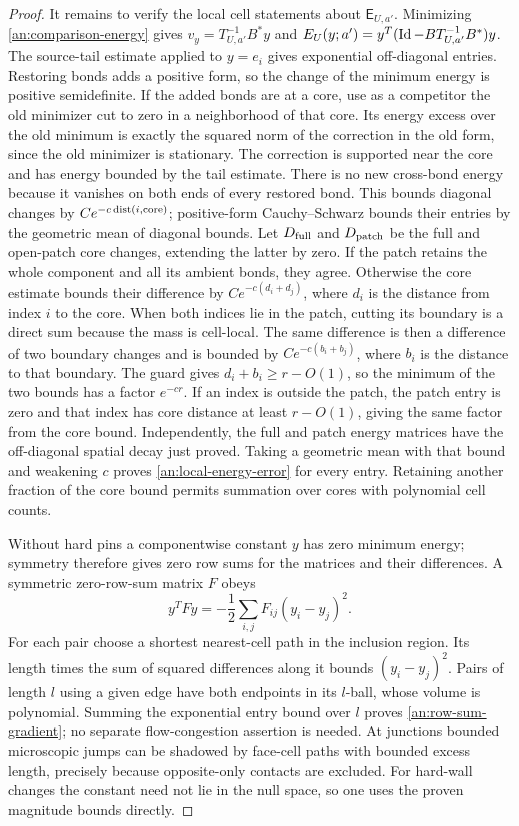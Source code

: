 \begin{proof}
It remains to verify the local cell statements about
$\mathsf E_{U,a'}$.  Minimizing
\eqref{an:comparison-energy} gives
$v_y=T_{U,a'}^{-1}B^*y$ and
$E_U(y;a')=y^T(\operatorname{Id}-BT_{U,a'}^{-1}B^*)y$.
The source-tail estimate applied to $y=e_i$
gives exponential off-diagonal entries.
Restoring bonds adds a positive form, so the
change of the minimum energy is positive
semidefinite.  If the added bonds are at a
core, use as a competitor the old minimizer
cut to zero in a neighborhood of that core.
Its energy excess over the old minimum is
exactly the squared norm of the correction
in the old form, since the old minimizer is
stationary.  The correction is supported
near the core and has energy bounded by
the tail estimate.  There is no new
cross-bond energy because it vanishes on
both ends of every restored bond.
This bounds diagonal changes by
$Ce^{-c\operatorname{dist}(i,\mathrm{core})}$;
positive-form Cauchy--Schwarz bounds their
entries by the geometric mean of diagonal bounds.  Let $D_{\rm full}$
and $D_{\rm patch}$ be the full and open-patch core changes, extending
the latter by zero.  If the patch retains the whole component and
all its ambient bonds, they agree.
Otherwise the core estimate bounds their difference by
$Ce^{-c(d_i+d_j)}$, where $d_i$ is the distance from index $i$ to
the core.  When both indices lie in the patch, cutting its boundary
is a direct sum because the mass is cell-local.  The same difference
is then a difference of two boundary changes and is bounded by
$Ce^{-c(b_i+b_j)}$, where $b_i$ is the distance to that boundary.
The guard gives $d_i+b_i\ge r-O(1)$, so the minimum of the two
bounds has a factor $e^{-cr}$.  If an index is outside the patch,
the patch entry is zero and that index has core distance at least
$r-O(1)$, giving the same factor from the core bound.
Independently, the full and patch energy matrices have the
off-diagonal spatial decay just proved.  Taking a geometric mean
with that bound and weakening $c$ proves
\eqref{an:local-energy-error} for every entry.  Retaining another
fraction of the core bound permits summation over cores with
polynomial cell counts.

Without hard pins a componentwise constant
$y$ has zero minimum energy; symmetry
therefore gives zero row sums for the
matrices and their differences.  A
symmetric zero-row-sum matrix $F$ obeys
\[
 y^TFy=-\frac12\sum_{i,j}F_{ij}(y_i-y_j)^2.
\]
For each pair choose a shortest
nearest-cell path in the inclusion
region.  Its length times the sum of
squared differences along it bounds
$(y_i-y_j)^2$.  Pairs of length $l$
using a given edge have both endpoints
in its $l$-ball, whose volume is
polynomial.  Summing the exponential
entry bound over $l$ proves
\eqref{an:row-sum-gradient}; no separate
flow-congestion assertion is needed.
At junctions bounded microscopic jumps
can be shadowed by face-cell paths
with bounded excess length, precisely
because opposite-only contacts are
excluded.  For hard-wall changes the
constant need not lie in the null
space, so one uses the proven magnitude
bounds directly.
\end{proof}

